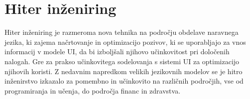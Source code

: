 \documentclass[a4paper,12pt,openright]{book}
\begin{document}
\cite{7577432}


\chapter{Hiter inženiring}

Hiter inženiring je razmeroma nova tehnika na področju obdelave naravnega jezika, ki zajema načrtovanje in optimizacijo pozivov, ki se uporabljajo za vnos informacij v modele UI, da bi izboljšali njihovo učinkovitost pri določenih nalogah. \cite{wang2024prompt} Gre za prakso učinkovitega sodelovanja s sistemi UI za optimizacijo njihovih koristi. Z nedavnim napredkom velikih jezikovnih modelov se je hitro inženirstvo izkazalo za pomembno in učinkovito na različnih področjih, vse od programiranja in učenja, do področja financ in zdravstva.
\cite{info:doi/10.2196/50638}
\end{document}
